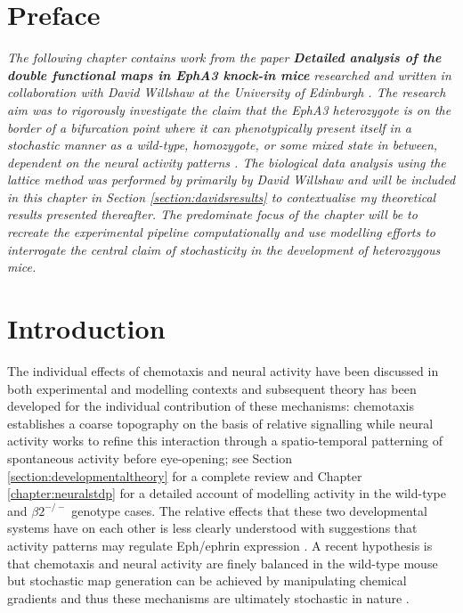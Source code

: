 \section{Preface}
\textit{The following chapter contains work from the paper \textbf{Detailed analysis of the double functional maps
in EphA3 knock-in mice} researched and written in collaboration with David Willshaw at the University of Edinburgh \cite{Willshaw2022-fs}. The research aim was to rigorously investigate the claim that the EphA3 heterozygote is on the border of a bifurcation point where it can phenotypically present itself in a stochastic manner as a wild-type, homozygote, or some mixed state in between, dependent on the neural activity patterns \cite{Owens2015-zv}. The biological data analysis using the lattice method was performed by primarily by David Willshaw and will be included in this chapter in Section \ref{section:davidsresults} to contextualise my theoretical results presented thereafter. The predominate focus of the chapter will be to recreate the experimental pipeline computationally and use modelling efforts to interrogate the central claim of stochasticity in the development of heterozygous mice. } 
\section{Introduction}
The individual effects of chemotaxis and neural activity have been discussed in both experimental and modelling contexts and subsequent theory has been developed for the individual contribution of these mechanisms: chemotaxis establishes a coarse topography on the basis of relative signalling while neural activity works to refine this interaction through a spatio-temporal patterning of spontaneous activity before eye-opening; see Section \ref{section:developmentaltheory} for a complete review and Chapter \ref{chapter:neuralstdp} for a detailed account of modelling activity in the wild-type and $\beta2^{-/-}$ genotype cases. The relative effects that these two developmental systems have on each other is less clearly understood with suggestions that activity patterns may regulate Eph/ephrin expression \cite{Lyngholm2019-fs, Nicol2007-rt}. A recent hypothesis is that chemotaxis and neural activity are finely balanced in the wild-type mouse but stochastic map generation can be achieved by manipulating chemical gradients and thus these mechanisms are ultimately stochastic in nature \cite{Owens2015-zv}. 

